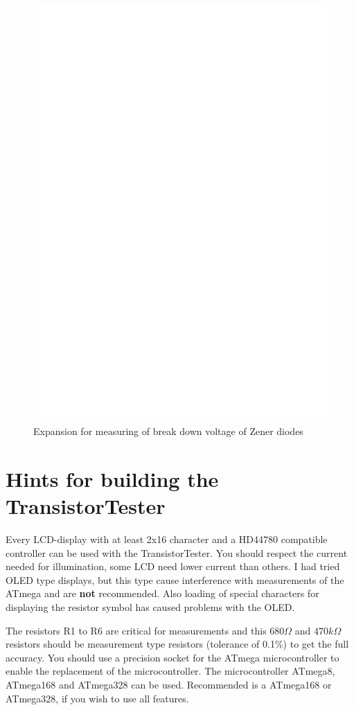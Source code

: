 \begin{figure}[H]
\centering
\includegraphics[width=12cm]{../FIG/zener_exp.eps}
\caption{Expansion for measuring of break down voltage of Zener diodes}
\label{fig:zener}
\end{figure}




\section{Hints for building the TransistorTester}
Every LCD-display with at least 2x16 character and a HD44780 compatible controller
can be used with the TransistorTester. You should respect the current needed for
illumination, some LCD need lower current than others.
I had tried OLED type displays, but this type cause interference with measurements
of the ATmega and are {\bf not} recommended. Also loading of special characters
for displaying the resistor symbol has caused problems with the OLED.

The resistors R1 to R6 are critical for measurements and this \(680\Omega\) and
\(470k\Omega\) resistors should be measurement type resistors (tolerance of 0.1\%) to
get the full accuracy.
You should use a precision socket for the ATmega microcontroller to enable
the replacement of the microcontroller.
The microcontroller ATmega8, ATmega168 and ATmega328 can be used.
Recommended is a ATmega168 or ATmega328, if you wish to use all features.

